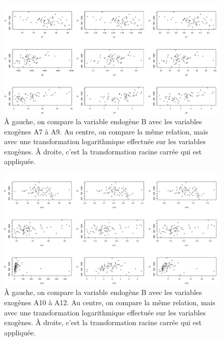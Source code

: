 \documentclass{article}
\begin{document}
	\begin{figure}[H]
		\includegraphics[width=\textwidth]{graphiques/Qst1_transformations_3}
		\caption{À gauche, on compare la variable endogène B avec les variables exogènes A7 à A9. Au centre, on compare la même relation, mais avec une transformation logarithmique effectuée sur les variables exogènes. À droite, c'est la transformation racine carrée qui est appliquée.}
		\label{Qst1_transformations_3}
	\end{figure}
	\begin{figure}[H]
		\includegraphics[width=\textwidth]{graphiques/Qst1_transformations_4}
		\caption{À gauche, on compare la variable endogène B avec les variables exogènes A10 à A12. Au centre, on compare la même relation, mais avec une transformation logarithmique effectuée sur les variables exogènes. À droite, c'est la transformation racine carrée qui est appliquée.}
		\label{Qst1_transformations_4}
	\end{figure}
\end{document}
